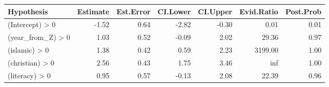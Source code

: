 \begin{tabular}{lrrrrrr}
\toprule
Hypothesis & Estimate & Est.Error & CI.Lower & CI.Upper & Evid.Ratio & Post.Prob \\
\midrule
(Intercept) > 0 & -1.52 & 0.64 & -2.82 & -0.30 & 0.01 & 0.01 \\
(year_from_Z) > 0 & 1.03 & 0.52 & -0.09 & 2.02 & 29.36 & 0.97 \\
(islamic) > 0 & 1.38 & 0.42 & 0.59 & 2.23 & 3199.00 & 1.00 \\
(christian) > 0 & 2.56 & 0.43 & 1.75 & 3.46 & inf & 1.00 \\
(literacy) > 0 & 0.95 & 0.57 & -0.13 & 2.08 & 22.39 & 0.96 \\
\bottomrule
\end{tabular}
